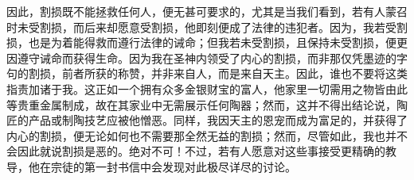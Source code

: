因此，割损既不能拯救任何人，便无甚可要求的，尤其是当我们看到，若有人蒙召时未受割损，而后来却愿意受割损，他即刻便成了法律的违犯者。因为，我若受割损，也是为着能得救而遵行法律的诫命；但我若未受割损，且保持未受割损，便更因遵守诫命而获得生命。因为我在圣神内领受了内心的割损，而非那仅凭墨迹的字句的割损，前者所获的称赞，并非来自人，而是来自天主。因此，谁也不要将这类指责加诸于我。这正如一个拥有众多金银财宝的富人，他家里一切需用之物皆由此等贵重金属制成，故在其家业中无需展示任何陶器；然而，这并不得出结论说，陶匠的产品或制陶技艺应被他憎恶。同样，我因天主的恩宠而成为富足的，并获得了内心的割损，便无论如何也不需要那全然无益的割损；然而，尽管如此，我也并不会因此就说割损是恶的。绝对不可！不过，若有人愿意对这些事接受更精确的教导，他在宗徒的第一封书信中会发现对此极尽详尽的讨论。\par

